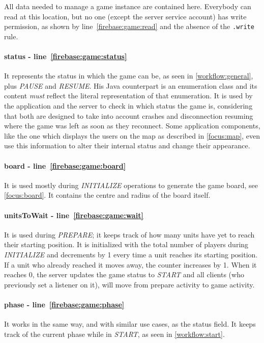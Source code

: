 				All data needed to manage a game instance are contained here.
				Everybody can read at this location, but no one (except the server service account) has write permission, as shown by line~\ref{firebase:game:read} and the absence of the \lstinline|.write| rule. \\
				
				\paragraph{status - line~\ref{firebase:game:status}}
				It represents the status in which the game can be, as seen in \autoref{workflow:general}, plus \emph{PAUSE} and \emph{RESUME}.
				His Java counterpart is an enumeration class and its content \emph{must} reflect the literal representation of that enumeration.
				It is used by the application and the server to check in which status the game is, considering that both are designed to take into account crashes and disconnection resuming where the game was left as soon as they reconnect.
				Some application components, like the one which displays the users on the map as described in \autoref{focus:map}, even use this information to alter their internal status and change their appearance.
				
				\paragraph{board - line~\ref{firebase:game:board}}
				It is used mostly during \emph{INITIALIZE} operations to generate the game board, see \autoref{focus:board}.
				It contains the centre and radius of the board itself.
				
				\paragraph{unitsToWait - line~\ref{firebase:game:wait}}
				It is used during \emph{PREPARE}; it keeps track of how many units have yet to reach their starting position.
				It is initialized with the total number of players during \emph{INITIALIZE} and decrements by 1 every time a unit reaches its starting position.
				If a unit who already reached it moves away, the counter increases by 1.
				When it reaches 0, the server updates the game status to \emph{START} and all clients (who previously set a listener on it), will move from prepare activity to game activity.
				
				\paragraph{phase - line~\ref{firebase:game:phase}}
				It works in the same way, and with similar use cases, as the status field.
				It keeps track of the current phase while in \emph{START}, as seen in \autoref{workflow:start}.
				
